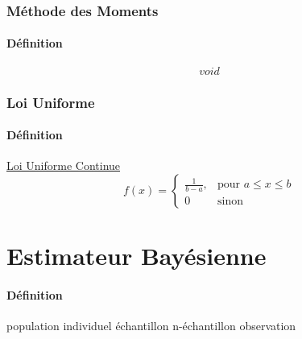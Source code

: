 \documentclass{article}
\begin{document}
\subsubsection{Méthode des Moments}
\paragraph{Définition}
\begin{equation}
    \boxed{
        void
    }
\end{equation}

\subsubsection{Loi Uniforme}
\paragraph{Définition} \href{https://fr.wikipedia.org/wiki/Loi_uniforme_continue}{Loi Uniforme Continue}
\begin{equation}
    \boxed{
        f(x) = 
        \begin{cases}
            \frac{1}{b-a},  & \text{pour } a \leq x \leq b\\
            0               & \text{sinon}    
        \end{cases}
    }
\end{equation}


\section{Estimateur Bayésienne}
\paragraph{Définition}







\newpage
population
individuel
échantillon
n-échantillon
observation
\end{document}
